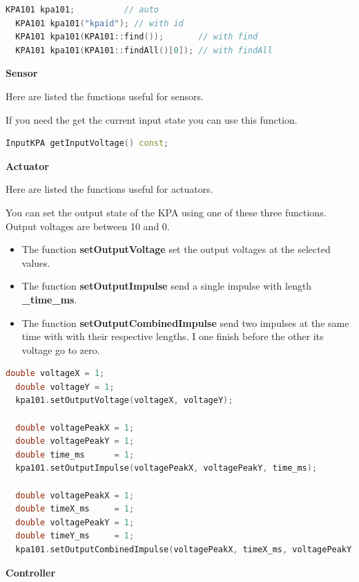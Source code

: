 \begin{lstlisting}[language=c++, gobble=2]
  KPA101 kpa101;          // auto
  KPA101 kpa101("kpaid"); // with id
  KPA101 kpa101(KPA101::find());       // with find
  KPA101 kpa101(KPA101::findAll()[0]); // with findAll
\end{lstlisting}

\textbf{Sensor}

Here are listed the functions useful for sensors.

If you need the get the current input state you can use this function.

\begin{lstlisting}[language=c++, gobble=2]
  InputKPA getInputVoltage() const;
\end{lstlisting}

\textbf{Actuator}

Here are listed the functions useful for actuators.

You can set the output state of the KPA using one of these three
functions. Output voltages are between 10 and 0.

\begin{itemize}
  \tightlist
  \item
        The function \textbf{setOutputVoltage} set the output voltages at the
        selected values.
  \item
        The function \textbf{setOutputImpulse} send a single impulse with
        length \textbf{\_time\_ms}.
  \item
        The function \textbf{setOutputCombinedImpulse} send two impulses at
        the same time with with their respective lengths. I one finish before
        the other its voltage go to zero.
\end{itemize}

\begin{lstlisting}[language=c++, gobble=2]
  double voltageX = 1;
  double voltageY = 1;
  kpa101.setOutputVoltage(voltageX, voltageY);

  double voltagePeakX = 1;
  double voltagePeakY = 1;
  double time_ms      = 1;
  kpa101.setOutputImpulse(voltagePeakX, voltagePeakY, time_ms);

  double voltagePeakX = 1;
  double timeX_ms     = 1;
  double voltagePeakY = 1;
  double timeY_ms     = 1;
  kpa101.setOutputCombinedImpulse(voltagePeakX, timeX_ms, voltagePeakY, timeY_ms);
\end{lstlisting}

\textbf{Controller}

